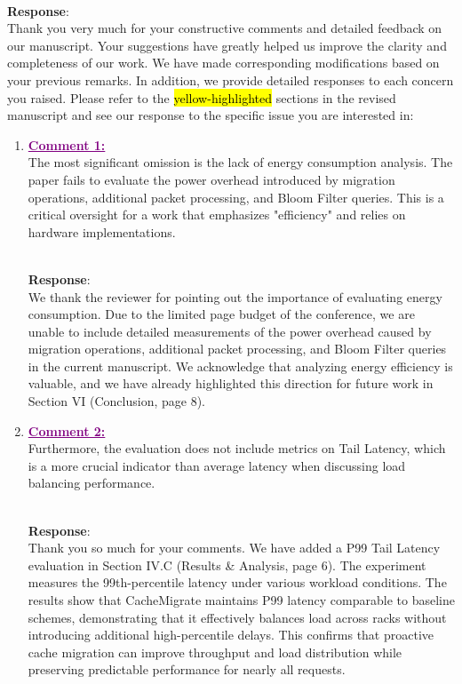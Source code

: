 \documentclass[11pt]{article}
\newcounter{reviewer}
\newcounter{point}[reviewer]
\newenvironment{reply}
   {\medskip \noindent \color{blue} \begin{sf}\\ \textbf{Response}:\\  }
   {\medskip \par \end{sf}}
\newcommand{\comment}[1]{\textcolor{purple}{\textbf{\underline{Comment #1:}}}\\}
\DeclareRobustCommand{\thanksfor}[1]{Thank you so much for #1}
\DeclareRobustCommand{\hlRevA}[1]{{\sethlcolor{yellow}\hl{#1}}}%
\begin{document}
\begin{reply}
    Thank you very much for your constructive comments and detailed feedback on our manuscript. Your suggestions have greatly helped us improve the clarity and completeness of our work. We have made corresponding modifications based on your previous remarks. In addition, we provide detailed responses to each concern you raised. Please refer to the \hlRevA{yellow-highlighted} sections in the revised manuscript and see our response to the specific issue you are interested in:
\end{reply}

\begin{enumerate}
    \item \comment{1} The most significant omission is the lack of energy consumption analysis. The paper fails to evaluate the power overhead introduced by migration operations, additional packet processing, and Bloom Filter queries. This is a critical oversight for a work that emphasizes "efficiency" and relies on hardware implementations.
          \begin{reply}
              We thank the reviewer for pointing out the importance of evaluating energy consumption. Due to the limited page budget of the conference, we are unable to include detailed measurements of the power overhead caused by migration operations, additional packet processing, and Bloom Filter queries in the current manuscript. We acknowledge that analyzing energy efficiency is valuable, and we have already highlighted this direction for future work in Section VI (Conclusion, page 8).
          \end{reply}

    \item \comment{2} Furthermore, the evaluation does not include metrics on Tail Latency, which is a more crucial indicator than average latency when discussing load balancing performance.
          \begin{reply}
              \thanksfor{your comments}. We have added a P99 Tail Latency evaluation in Section IV.C (Results \& Analysis, page 6). The experiment measures the 99th-percentile latency under various workload conditions. The results show that CacheMigrate maintains P99 latency comparable to baseline schemes, demonstrating that it effectively balances load across racks without introducing additional high-percentile delays. This confirms that proactive cache migration can improve throughput and load distribution while preserving predictable performance for nearly all requests.
          \end{reply}


\end{enumerate}
\end{document}
